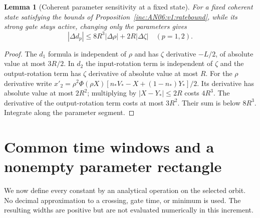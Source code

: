 \documentclass[11pt]{article}
\numberwithin{equation}{section}
\newtheorem{lemma}[theorem]{Lemma}
\theoremstyle{remark}\newtheorem{remark}[theorem]{Remark}
\newcommand{\1}{\mathbf 1}
\begin{document}
\begin{lemma}[Coherent parameter sensitivity at a fixed state]
\label{inc:AN06:v1:paramrate}
For a fixed coherent state satisfying the bounds of
Proposition~\ref{inc:AN06:v1:ratebound}, while its strong gate stays active,
changing only the parameters gives
\[
 |\Delta d_p|\le8R^3|\Delta\rho|+2R|\Delta\zeta|\quad(p=1,2).
\]
\end{lemma}
\begin{proof}
The $d_1$ formula is independent of $\rho$ and has $\zeta$ derivative
$-L/2$, of absolute value at most $3R/2$.
In $d_2$ the input-rotation term is independent of $\zeta$ and the
output-rotation term has $\zeta$ derivative of absolute value at most $R$.
For the $\rho$ derivative write
$x'_2=\rho^2\Phi(\rho X)[n_*V_*-X+(1-n_*)Y_*]/2$.
Its derivative has absolute value at most $2R^2$; multiplying by
$|X-Y_*|\le2R$ costs $4R^3$.
The derivative of the output-rotation term costs at most $3R^2$.
Their sum is below $8R^3$. Integrate along the parameter segment.
\end{proof}

\section{Common time windows and a nonempty parameter rectangle}
\label{inc:AN06:v1:commonwindows}
We now define every constant by an analytical operation on the selected
orbit. No decimal approximation to a crossing, gate time, or minimum is
used. The resulting widths are positive but are not evaluated numerically
in this increment.
\end{document}
